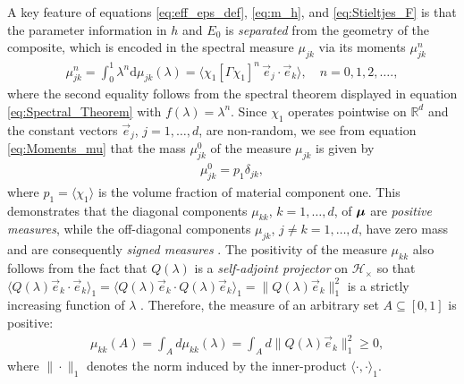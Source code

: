 \documentclass{cmslatex}
\renewcommand{\d}{\text{d}}
\newcommand\bmu{\mbox{\boldmath${\mu}$}}
\begin{document}
A key feature of equations \eqref{eq:eff_eps_def}, \eqref{eq:m_h}, and
\eqref{eq:Stieltjes_F} is that the parameter information in $h$ and
$E_0$ is \emph{separated} from the geometry of the composite, which is
encoded in the spectral measure $\mu_{jk}$ via its moments $\mu_{jk}^n$
\cite{Golden:CMP-473,Bruno:JSP-365}
%
\begin{align}\label{eq:Moments_mu}
  \mu_{jk}^n=\int_0^1\lambda^n\d\mu_{jk}(\lambda)       
       =\langle\chi_1[\Gamma \chi_1]^n\,\vec{e}_j\cdot\vec{e}_k\rangle,
  \quad n=0,1,2,\ldots.,
\end{align}
%
where the second equality follows from the spectral theorem displayed
in equation \eqref{eq:Spectral_Theorem} with $f(\lambda)=\lambda^n$. Since $\chi_1$
operates pointwise on $\mathbb{R}^d$ and the constant vectors
$\vec{e}_j$, $j=1,\ldots,d$, are non-random, we see from equation
\eqref{eq:Moments_mu} that the mass $\mu_{jk}^0$ of the measure
$\mu_{jk}$ is given by
%
\begin{align}\label{eq:Measure_Mass_ConT}
  \mu_{jk}^0=p_1\delta_{jk},
\end{align}
%
where $p_1=\langle\chi_1\rangle$ is the volume fraction of material component
one. This demonstrates that the diagonal components $\mu_{kk}$,
$k=1,\ldots,d$, of $\bmu$ are \emph{positive measures}, 
while the off-diagonal components $\mu_{jk}$, $j\neq k=1,\ldots,d$, have 
zero mass and are consequently \emph{signed measures}
\cite{Folland:99,Rudin:87}. The positivity of the measure $\mu_{kk}$ also
follows from the fact that $Q(\lambda)$ is a \emph{self-adjoint projector}
on $\mathscr{H}_\times$ so that  $\langle Q(\lambda)\vec{e}_k\cdot\vec{e}_k\rangle_1=\langle Q(\lambda)\vec{e}_k\cdot
Q(\lambda)\vec{e}_k\rangle_1=\|Q(\lambda)\vec{e}_k\|_1^2$ is a strictly increasing 
function of $\lambda$ \cite{Reed-1980,Stone:64}. Therefore, the measure of
an arbitrary set $A\subseteq[0,1]$ is positive:
% 
\begin{align}\label{eq:Mass_Sign_Measures}   
   &\mu_{kk}(A)=\int_Ad\mu_{kk}(\lambda)
           =\int_Ad\|Q(\lambda)\vec{e}_k\|_1^2\geq0,
\end{align}
%
where $\|\cdot\|_1$ denotes the norm induced by the inner-product
$\langle\cdot,\cdot\rangle_1$. 
\end{document}
